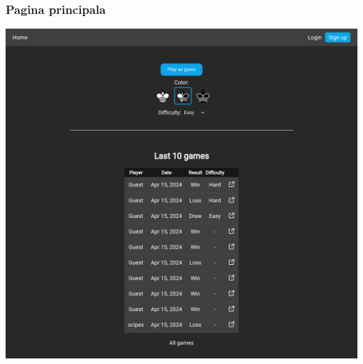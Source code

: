\subsubsection{Pagina principala}

\vspace{1cm}
\begin{center}
	\includegraphics[width=15cm]{3/frontend/homepage.png}
\end{center}
\vspace{1cm}

